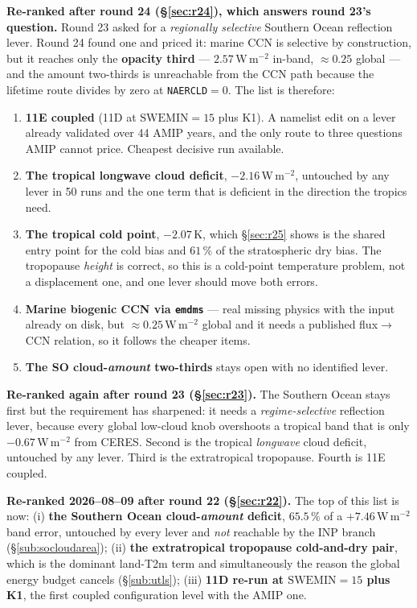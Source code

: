 \documentclass[10pt]{article}
\begin{document}
\textbf{Re-ranked after round 24 (\S\ref{sec:r24}), which answers round 23's question.}
Round 23 asked for a \emph{regionally selective} Southern Ocean reflection lever. Round 24
found one and priced it: marine CCN is selective by construction, but it reaches only the
\textbf{opacity third} --- $2.57$\,W\,m$^{-2}$ in-band, ${\approx}0.25$ global --- and the
amount two-thirds is unreachable from the CCN path because the lifetime route divides by
zero at \texttt{NAERCLD}$=0$. The list is therefore:
\begin{enumerate}\itemsep2pt
\item \textbf{11E coupled} (11D at $\mathrm{SWEMIN}=15$ plus K1). A namelist edit on a lever
already validated over 44 AMIP years, and the only route to three questions AMIP cannot
price. Cheapest decisive run available.
\item \textbf{The tropical longwave cloud deficit}, $-2.16$\,W\,m$^{-2}$, untouched by any
lever in 50 runs and the one term that is deficient in the direction the tropics need.
\item \textbf{The tropical cold point}, $-2.07$\,K, which \S\ref{sec:r25} shows is the
shared entry point for the cold bias and $61\,\%$ of the stratospheric dry bias. The
tropopause \emph{height} is correct, so this is a cold-point temperature problem, not a
displacement one, and one lever should move both errors.
\item \textbf{Marine biogenic CCN via \texttt{emdms}} --- real missing physics with the input
already on disk, but ${\approx}0.25$\,W\,m$^{-2}$ global and it needs a published
flux$\to$CCN relation, so it follows the cheaper items.
\item \textbf{The SO cloud-\emph{amount} two-thirds} stays open with no identified lever.
\end{enumerate}

\textbf{Re-ranked again after round 23 (\S\ref{sec:r23}).} The Southern Ocean stays first
but the requirement has sharpened: it needs a \emph{regime-selective} reflection lever, because
every global low-cloud knob overshoots a tropical band that is only $-0.67$\,W\,m$^{-2}$ from
CERES. Second is the tropical \emph{longwave} cloud deficit, untouched by any lever. Third is
the extratropical tropopause. Fourth is 11E coupled.

\textbf{Re-ranked 2026--08--09 after round 22 (\S\ref{sec:r22}).} The top of this list is
now: (i) \textbf{the Southern Ocean cloud-\emph{amount} deficit}, $65.5\,\%$ of a
$+7.46$\,W\,m$^{-2}$ band error, untouched by every lever and \emph{not} reachable by the
INP branch (\S\ref{sub:socloudarea}); (ii) \textbf{the extratropical tropopause cold-and-dry
pair}, which is the dominant land-T2m term and simultaneously the reason the global energy
budget cancels (\S\ref{sub:utls}); (iii) \textbf{11D re-run at $\mathrm{SWEMIN}=15$ plus
K1}, the first coupled configuration level with the AMIP one.
\end{document}
